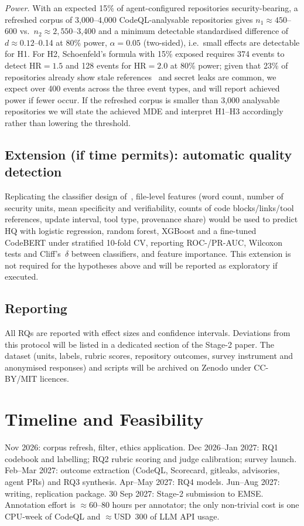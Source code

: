 \documentclass[10pt,conference]{IEEEtran}
\begin{document}
\emph{Power.} With an expected 15\% of agent-configured repositories security-bearing, a refreshed corpus of 3,000--4,000 CodeQL-analysable repositories gives $n_1\approx450$--600 vs.\ $n_2\approx2,550$--3,400 and a minimum detectable standardised difference of $d\approx0.12$--0.14 at 80\% power, $\alpha=0.05$ (two-sided), i.e.\ small effects are detectable for H1. For H2, Schoenfeld's formula with 15\% exposed requires 374 events to detect HR$=1.5$ and 128 events for HR$=2.0$ at 80\% power; given that 23\% of repositories already show stale references~\cite{treude2026contextrot} and secret leaks are common, we expect over 400 events across the three event types, and will report achieved power if fewer occur. If the refreshed corpus is smaller than 3,000 analysable repositories we will state the achieved MDE and interpret H1--H3 accordingly rather than lowering the threshold.

\subsection{Extension (if time permits): automatic quality detection}
Replicating the classifier design of~\cite{lu2026modelcard}, file-level features (word count, number of security units, mean specificity and verifiability, counts of code blocks/links/tool references, update interval, tool type, provenance share) would be used to predict HQ with logistic regression, random forest, XGBoost and a fine-tuned CodeBERT under stratified 10-fold CV, reporting ROC-/PR-AUC, Wilcoxon tests and Cliff's~$\delta$ between classifiers, and feature importance. This extension is not required for the hypotheses above and will be reported as exploratory if executed.

\subsection{Reporting}
All RQs are reported with effect sizes and confidence intervals. Deviations from this protocol will be listed in a dedicated section of the Stage-2 paper. The dataset (units, labels, rubric scores, repository outcomes, survey instrument and anonymised responses) and scripts will be archived on Zenodo under CC-BY/MIT licences.

\section{Timeline and Feasibility}
Nov 2026: corpus refresh, filter, ethics application. Dec 2026--Jan 2027: RQ1 codebook and labelling; RQ2 rubric scoring and judge calibration; survey launch. Feb--Mar 2027: outcome extraction (CodeQL, Scorecard, gitleaks, advisories, agent PRs) and RQ3 synthesis. Apr--May 2027: RQ4 models. Jun--Aug 2027: writing, replication package. 30 Sep 2027: Stage-2 submission to EMSE. Annotation effort is $\approx$60--80 hours per annotator; the only non-trivial cost is one CPU-week of CodeQL and $\approx$USD~300 of LLM API usage.
\end{document}
